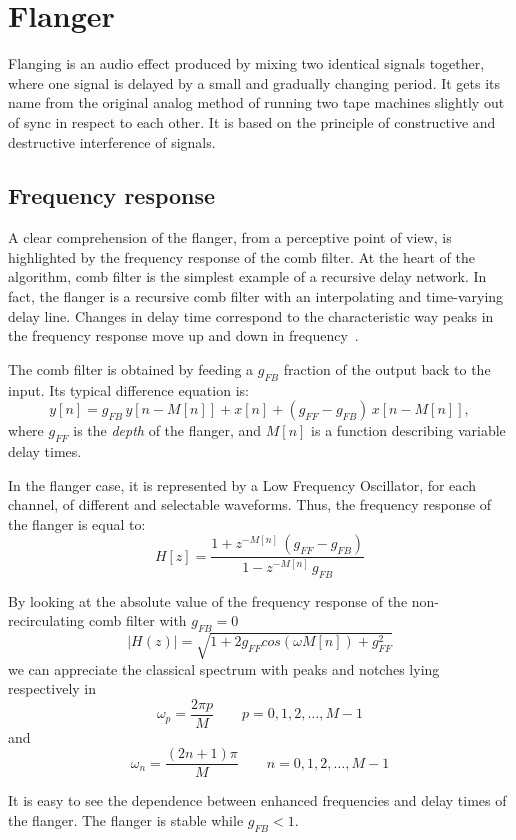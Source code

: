 \section{Flanger}
\label{sec:flanger}

Flanging is an audio effect produced by mixing two identical signals together, where one signal is delayed by a small and gradually changing period.
It gets its name from the original analog method of running two tape machines slightly out of sync in respect to each other.
It is based on the principle of constructive and destructive interference of signals.

\subsection{Frequency response}\label{sec:combfilt}

A clear comprehension of the flanger, from a perceptive point of view, is highlighted by the frequency response of the comb filter.
At the heart of the algorithm, comb filter is the simplest example of a recursive delay network.
In fact, the flanger is a recursive comb filter with an interpolating and time-varying delay line.
Changes in delay time correspond to the characteristic way peaks in the frequency response move up and down in frequency~\cite{puckette2006theory}.

The comb filter is obtained by feeding a $g_{FB}$ fraction of the output back to the input. Its typical difference equation is:
\[
y[n] = g_{FB} \, y[n - M[n]] + x[n] + (g_{FF} - g_{FB}) \, x[n - M[n]],
\]
where $g_{FF}$ is the \emph{depth} of the flanger, and $M[n]$ is a function describing variable delay times.

In the flanger case, it is represented by a Low Frequency Oscillator, for each channel, of different and selectable waveforms. Thus, the frequency response of the flanger is equal to:
\[
	H[z] = \frac{1 + z^{
			-M[n]} \, \left( g_{FF} - g_{FB} \right)
	}{
		1 - z^{-M[n]} \, g_{FB}
	}
\]

By looking at the absolute value of the frequency response of the non-recirculating comb filter with $g_{FB} = 0$
\[
|H(z)| = \sqrt{ 1 + 2g_{FF} cos(\omega M[n]) + g_{FF}^2}
\]
we can appreciate the classical spectrum with peaks and notches lying respectively in 
\[
\omega_p = \frac{2 \pi p}{M} \qquad  p = 0, 1, 2, \dots, M-1
\]
and 
\[
\omega_n = \frac{(2n+1) \pi}{M} \qquad n = 0, 1, 2, \dots, M-1
\]

It is easy to see the dependence between enhanced frequencies and delay times of the flanger. The flanger is stable while $g_{FB} < 1$.

